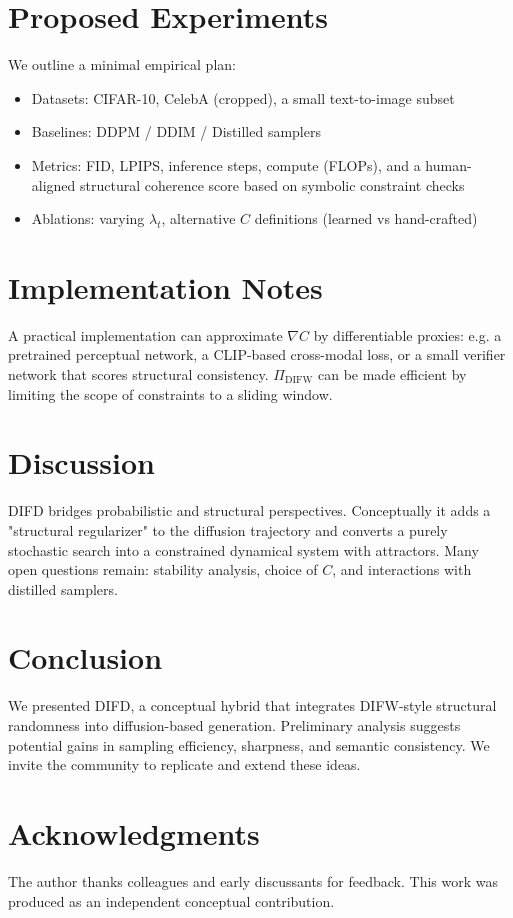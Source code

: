 \documentclass[11pt]{article}
\begin{document}
\section{Proposed Experiments}
We outline a minimal empirical plan:
\begin{itemize}
  \item Datasets: CIFAR-10, CelebA (cropped), a small text-to-image subset
  \item Baselines: DDPM / DDIM / Distilled samplers
  \item Metrics: FID, LPIPS, inference steps, compute (FLOPs), and a human-aligned structural
  coherence score based on symbolic constraint checks
  \item Ablations: varying $\lambda_t$, alternative $C$ definitions (learned vs hand-crafted)
\end{itemize}

\section{Implementation Notes}
A practical implementation can approximate $\nabla C$ by differentiable proxies: e.g. a
pretrained perceptual network, a CLIP-based cross-modal loss, or a small verifier network
that scores structural consistency. $\Pi_{\mathrm{DIFW}}$ can be made efficient by limiting the
scope of constraints to a sliding window.

\section{Discussion}
DIFD bridges probabilistic and structural perspectives. Conceptually it adds a "structural
regularizer" to the diffusion trajectory and converts a purely stochastic search into a
constrained dynamical system with attractors. Many open questions remain: stability analysis,
choice of $C$, and interactions with distilled samplers.

\section{Conclusion}
We presented DIFD, a conceptual hybrid that integrates DIFW-style structural randomness into
diffusion-based generation. Preliminary analysis suggests potential gains in sampling
efficiency, sharpness, and semantic consistency. We invite the community to replicate and
extend these ideas.

\section*{Acknowledgments}
The author thanks colleagues and early discussants for feedback. This work was produced as an
independent conceptual contribution.
\end{document}
